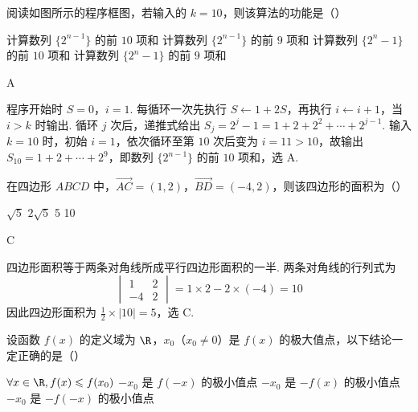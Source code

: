 \begin{problem}
阅读如图所示的程序框图，若输入的 \(k = 10\)，则该算法的功能是（\quad）


\choices
    {计算数列 \(\{2^{n-1}\}\) 的前 \(10\) 项和}
    {计算数列 \(\{2^{n-1}\}\) 的前 \(9\) 项和}
    {计算数列 \(\{2^{n}-1\}\) 的前 \(10\) 项和}
    {计算数列 \(\{2^{n}-1\}\) 的前 \(9\) 项和}
\end{problem}

\begin{answer}
A
\end{answer}

\begin{solution}
程序开始时 \(S=0\)，\(i=1\). 每循环一次先执行 \(S\leftarrow1+2S\)，再执行 \(i\leftarrow i+1\)，当 \(i>k\) 时输出. 循环 \(j\) 次后，递推式给出 \(S_j=2^j-1=1+2+2^2+\cdots+2^{j-1}\). 输入 \(k=10\) 时，初始 \(i=1\)，依次循环至第 \(10\) 次后变为 \(i=11>10\)，故输出 \(S_{10}=1+2+\cdots+2^9\)，即数列 \(\{2^{n-1}\}\) 的前 \(10\) 项和，选 A.
\end{solution}

\begin{problem}
在四边形 \(ABCD\) 中，\(\overrightarrow{AC} = (1, 2)\)，\(\overrightarrow{BD} = (-4, 2)\)，则该四边形的面积为（\quad）

\choices
    {\(\sqrt{5}\)}
    {\(2\sqrt{5}\)}
    {5}
    {10}
\end{problem}

\begin{answer}
C
\end{answer}

\begin{solution}
四边形面积等于两条对角线所成平行四边形面积的一半. 两条对角线的行列式为
\[
\begin{vmatrix}1&2\\-4&2\end{vmatrix}=1\times2-2\times(-4)=10
\]
因此四边形面积为 \(\frac12\times|10|=5\)，选 C.
\end{solution}

\begin{problem}
设函数 \(f(x)\) 的定义域为 \(\R\)，\(x_0\)（\(x_0 \neq 0\)）是 \(f(x)\) 的极大值点，以下结论一定正确的是（\quad）

\choices
    {\(\forall x \in \R, f(x) \leqslant f(x_0)\)}
    {\(-x_0\) 是 \(f(-x)\) 的极小值点}
    {\(-x_0\) 是 \(-f(x)\) 的极小值点}
    {\(-x_0\) 是 \(-f(-x)\) 的极小值点}
\end{problem}

